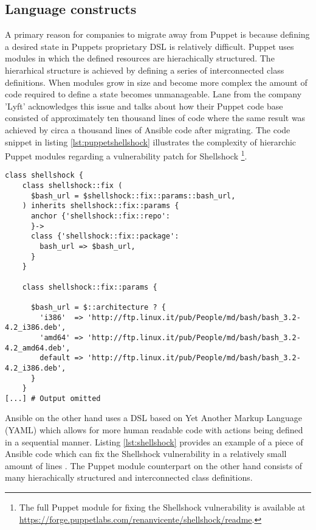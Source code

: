 \subsection{Language constructs}
A primary reason for companies to migrate away from Puppet is because defining a desired state in Puppets proprietary DSL is relatively difficult. Puppet uses modules in which the defined resources are hierachically structured. The hierarhical structure is achieved by defining a series of interconnected class definitions. When modules grow in size and become more complex the amount of code required to define a state becomes unmanageable. Lane \cite{movingawayfrompuppet} from the company 'Lyft' acknowledges this issue and talks about how their Puppet code base consisted of approximately ten thousand lines of code where the same result was achieved by circa a thousand lines of Ansible code after migrating. The code snippet in listing \ref{lst:puppetshellshock} illustrates the complexity of hierarchic Puppet modules regarding a vulnerability patch for Shellshock \footnote{The full Puppet module for fixing the Shellshock vulnerability is available at \url{https://forge.puppetlabs.com/renanvicente/shellshock/readme}.}.
\\
\begin{lstlisting}[caption={Code snippet - Shellshock security patching with Puppet module},label=lst:puppetshellshock]
class shellshock {
	class shellshock::fix (
	  $bash_url = $shellshock::fix::params::bash_url,
	) inherits shellshock::fix::params {
	  anchor {'shellshock::fix::repo':
	  }->
	  class {'shellshock::fix::package':
	    bash_url => $bash_url,
	  }
	}

	class shellshock::fix::params {

	  $bash_url = $::architecture ? {
	    'i386'  => 'http://ftp.linux.it/pub/People/md/bash/bash_3.2-4.2_i386.deb',
	    'amd64' => 'http://ftp.linux.it/pub/People/md/bash/bash_3.2-4.2_amd64.deb',
	    default => 'http://ftp.linux.it/pub/People/md/bash/bash_3.2-4.2_i386.deb',
	  }
	}
[...] # Output omitted
\end{lstlisting}
\noindent
Ansible on the other hand uses a DSL based on Yet Another Markup Language (YAML) which allows for more human readable code with actions being defined in a sequential manner. Listing \ref{lst:shellshock} provides an example of a piece of Ansible code which can fix the Shellshock vulnerability in a relatively small amount of lines \cite{severdensity_2015}. The Puppet module counterpart on the other hand consists of many hierachically structured and interconnected class definitions.
